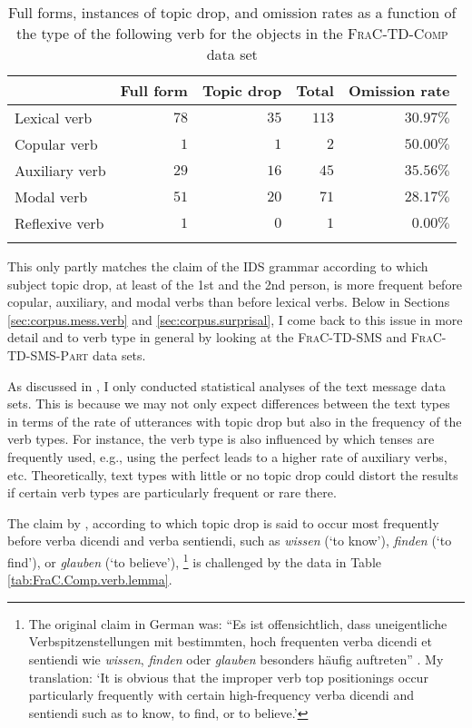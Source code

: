 \begin{table}
\caption{Full forms, instances of topic drop, and omission rates as a function of the type of the following verb for the objects in the \textsc{FraC-TD-Comp} data set}
\centering
\begin{tabular}{lrrrr}
\lsptoprule
\multicolumn{1}{c}{Verb type} & \multicolumn{1}{c}{Full form} & \multicolumn{1}{c}{Topic drop} & \multicolumn{1}{c}{Total} & \multicolumn{1}{c}{Omission rate}\\
\midrule
Lexical verb& $78$ & $35$ & $113$ &  $30.97\%$  \\
Copular verb &  $1$ & $1$ & $2$ &  $50.00\%$  \\
Auxiliary verb &  $29$ & $16$ & $45$ & $35.56\%$ \\
Modal verb&  $51$ & $20$ & $71$ & $28.17\%$ \\
Reflexive verb& $1$ & $0$ & $1$ & $0.00\%$  \\
\lspbottomrule
\end{tabular}
\label{tab:FraC.Comp.verb.type.obj}
\end{table}

This only partly matches the claim of the IDS grammar \citep[415]{zifonun.etal1997} according to which subject topic drop, at least of the 1st and the 2nd person, is more frequent before copular, auxiliary, and modal verbs than before lexical verbs.
Below in Sections \ref{sec:corpus.mess.verb} and \ref{sec:corpus.surprisal}, I come back to this issue in more detail and to verb type in general by looking at the \textsc{FraC-TD-SMS} and \textsc{FraC-TD-SMS-Part} data sets.

As discussed in , I only conducted statistical analyses of the text message data sets.
This is because we may not only expect differences between the text types in terms of the rate of utterances with topic drop but also in the frequency of the verb types.
For instance, the verb type is also influenced by which tenses are frequently used, e.g., using the perfect leads to a higher rate of auxiliary verbs, etc.
Theoretically, text types with little or no topic drop could distort the results if certain verb types are particularly frequent or rare there.
    

\largerpage
The claim by \citet[297]{imo2013}, according to which topic drop is said to occur most frequently before verba dicendi and verba sentiendi, such as \textit{wissen} (`to know'), \textit{finden} (`to find'), or \textit{glauben} (`to believe'),%
\footnote{The original claim in German was: ``Es ist offensichtlich, dass uneigentliche Verbspitzenstellungen mit bestimmten, hoch frequenten verba dicendi et sentiendi wie \textit{wissen}, \textit{finden} oder \textit{glauben} besonders häufig auftreten'' \citep[297]{imo2013}.
My translation: `It is obvious that the improper verb top positionings occur particularly frequently with certain high-frequency verba dicendi and sentiendi such as to know, to find, or to believe.'}
%
is challenged by the data in Table \ref{tab:FraC.Comp.verb.lemma}.\clearpage

